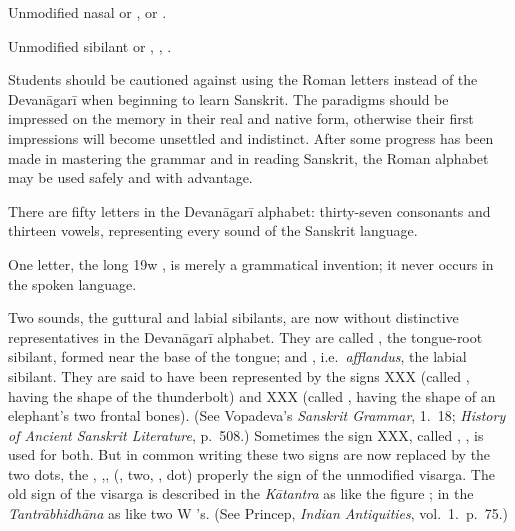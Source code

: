 



Unmodified nasal or , {\dn {\rs -\re}\2}  or {\dn {\rs -\re}\1} .

Unmodified sibilant or , {\dn ,} .

Students should be cautioned against using the Roman letters instead of
the Devanāgarī when beginning to learn Sanskrit. The paradigms should be
impressed on the memory in their real and native form, otherwise their
first impressions will become unsettled and indistinct. After some
progress has been made in mastering the grammar and in reading Sanskrit,
the Roman alphabet may be used safely and with advantage.

\s There are fifty letters in the Devanāgarī alphabet: thirty-seven
consonants and thirteen vowels, representing every sound of the Sanskrit
language.

\s One letter, the long {\dn \319w} , is merely a grammatical
invention; it never occurs in the spoken language.

\s Two sounds, the guttural and labial sibilants, are now without
distinctive representatives in the Devanāgarī alphabet. They are called
, the tongue-root sibilant, formed near the base of the
tongue; and , i.e.\ \emph{afflandus}, the labial
sibilant. They are said to have been represented by the signs XXX
(called , having the shape of the thunderbolt) and XXX
(called , having the shape of an elephant's two
frontal bones). (See Vopadeva's \emph{Sanskrit Grammar}, 1.\ 18;
\emph{History of Ancient Sanskrit Literature}, p.\ 508.) Sometimes the
sign XXX, called , , is used for
both. But in common writing these two signs are now replaced by the two
dots, the , {\dn ,}, (, two, , dot) properly
the sign of the unmodified visarga.
The old sign of the visarga is described in the \emph{Kātantra} as like
the figure \cmnum {}; in the \emph{Tantrābhidhāna} as like
two {\dn W} 's. (See Princep, \emph{Indian Antiquities}, vol.\ 1.\
p.\ 75.)
%

